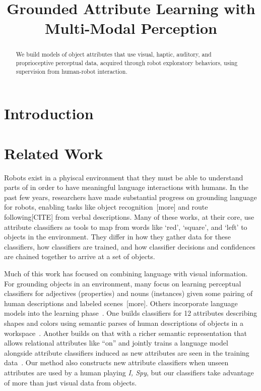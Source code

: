 \documentclass{article}
\title{Grounded Attribute Learning with Multi-Modal Perception}
\begin{document}
\maketitle

\begin{abstract}
	We build models of object attributes that use visual, haptic, auditory, and proprioceptive perceptual data, acquired through robot exploratory behaviors, using supervision from human-robot interaction.
\end{abstract}

\section{Introduction}

\section{Related Work}

	Robots exist in a phyiscal environment that they must be able to understand parts of in order to have meaningful language interactions with humans. In the past few years, researchers have made substantial progress on grounding language for robots, enabling tasks like object recognition~\cite{liu:acl14}[more] and route following[CITE] from verbal descriptions. Many of these works, at their core, use attribute classifiers as tools to map from words like `red', `square', and `left' to objects in the environment. They differ in how they gather data for these classifiers, how classifiers are trained, and how classifier decisions and confidences are chained together to arrive at a set of objects.

	Much of this work has focused on combining language with visual information. For grounding objects in an environment, many focus on learning perceptual classifiers for adjectives (properties) and nouns (instances) given some pairing of human descriptions and labeled scenes~\cite{dindo:iros10,sun:icra13}[more]. Others incorporate language models into the learning phase~\cite{perera:aaai13}. One builds classifiers for 12 attributes describing shapes and colors using semantic parses of human descriptions of objects in a workspace~\cite{matuszek:icml12}. Another builds on that with a richer semantic representation that allows relational attributes like ``on'' and jointly trains a language model alongside attribute classifiers induced as new attributes are seen in the training data~\cite{krishnamurthy:acl13}. Our method also constructs new attribute classifiers when unseen attributes are used by a human playing \textit{I, Spy}, but our classifiers take advantage of more than just visual data from objects.
\end{document}

